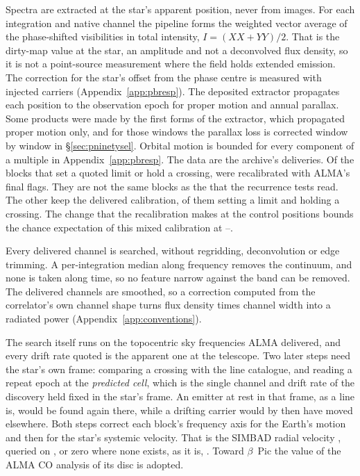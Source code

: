 Spectra are extracted at the star's apparent position, never from images. For
each integration and native channel the pipeline forms the weighted vector
average of the phase-shifted visibilities in total intensity, $I=(XX+YY)/2$.
That is the dirty-map value at the star, an amplitude and not a deconvolved
flux density, so it is not a point-source measurement where the field holds
extended emission. The correction for the star's offset from the phase
centre is measured with injected carriers (Appendix~\ref{app:pbresp}).
The deposited extractor propagates each position to the observation epoch
for proper motion and annual parallax. Some products were made by the first
forms of the extractor, which propagated proper motion only, and for those
windows the parallax loss is corrected window by window in
\S\ref{sec:pninetysel}.
Orbital motion is bounded for every component of a multiple in
Appendix~\ref{app:pbresp}.
%
The data are the archive's deliveries. Of the \RflNEbCoreAll{} blocks that
set a quoted limit or hold a crossing, \RflNEbCore{} were recalibrated with
ALMA's final flags. They are not the same blocks as the \ZcNRecEB{} that
the recurrence tests read. The other \RflNEbNot{} keep the delivered
calibration, \RflNNotLim{} of them setting a limit and \RflNNotCross{}
holding a crossing. The change that the recalibration makes at the control
positions bounds the chance expectation of this mixed calibration at
\RflCeLo--\RflCeHi.

Every delivered channel is searched, without regridding, deconvolution or
edge trimming. A per-integration median along frequency removes the
continuum, and none is taken along time, so no feature narrow against the
band can be removed. The delivered channels are smoothed, so a correction
computed from the correlator's own channel shape turns flux density times
channel width into a radiated power (Appendix~\ref{app:conventions}).

The search itself runs on the topocentric sky frequencies ALMA delivered, and
every drift rate quoted is the apparent one at the telescope. Two later steps
need the star's own frame: comparing a crossing with the line catalogue, and
reading a repeat epoch at the \emph{predicted cell}, which is the single
channel and drift rate of the discovery held fixed in the star's frame. An
emitter at rest in that frame, as a line is, would be found again there,
while a drifting carrier would by then have moved elsewhere. Both steps
correct each block's frequency axis for the Earth's motion and then for the
star's systemic velocity. That is the SIMBAD radial velocity \citep{SIMBAD2000},
queried on \SimbadQueryDate, or zero where none exists, as it is,
\FrZeroVsysClause. Toward $\beta$~Pic the value of the ALMA CO analysis of
its disc \citep{Matra2017} is adopted.

